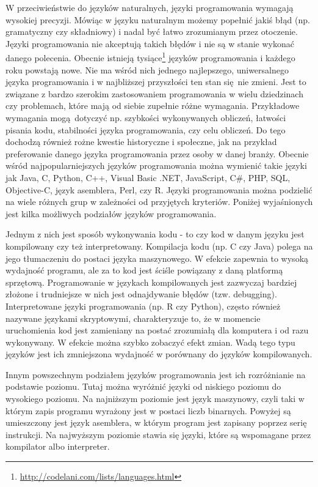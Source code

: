 \documentclass[paper=6in:9in,pagesize=pdftex,headinclude=on,footinclude=on,10pt]{scrbook}
\begin{document}
W przeciwieństwie do języków naturalnych, języki programowania wymagają wysokiej precyzji.
Mówiąc w języku naturalnym możemy popełnić jakiś błąd (np. gramatyczny czy składniowy) i nadal być łatwo zrozumianym przez otoczenie.
Języki programowania nie akceptują takich błędów i nie są w stanie wykonać danego polecenia.
Obecnie istnieją tysiące\footnote{\url{http://codelani.com/lists/languages.html}} języków programowania i każdego roku powstają nowe.
Nie ma wśród nich jednego najlepszego, uniwersalnego języka programowania i w najbliższej przyszłości ten stan się~nie zmieni.
Jest to związane z bardzo szerokim zastosowaniem programowania w wielu dziedzinach czy problemach, które mają od siebie zupełnie różne wymagania.
Przykładowe wymagania mogą~dotyczyć np. szybkości wykonywanych obliczeń, łatwości pisania kodu, stabilności języka programowania, czy celu obliczeń.
Do tego dochodzą również rożne kwestie historyczne i społeczne, jak na przykład preferowanie danego języka programowania przez osoby w danej branży.
Obecnie wśród najpopularniejszych języków programowania można wymienić takie języki jak Java, C, Python, C++, Visual Basic .NET, JavaScript, C\#, PHP, SQL, Objective-C, język asemblera, Perl, czy R.
Języki programowania można podzielić na wiele różnych grup w zależności od przyjętych kryteriów.
Poniżej wyjaśnionych jest kilka możliwych podziałów języków programowania.

Jednym z nich jest sposób wykonywania kodu - to czy kod w danym języku jest kompilowany czy też interpretowany.
Kompilacja kodu (np. C czy Java) polega na jego tłumaczeniu do postaci języka maszynowego.
W efekcie zapewnia to wysoką wydajność programu, ale za to kod jest ściśle powiązany z daną platformą sprzętową.
Programowanie w językach kompilowanych jest zazwyczaj bardziej złożone i trudniejsze w nich jest odnajdywanie błędów (tzw. debugging).
Interpretowane języki programowania (np. R czy Python), często również nazywane językami skryptowymi, charakteryzuje to,
że w momencie uruchomienia kod jest zamieniany na postać zrozumiałą dla komputera i od razu wykonywany.
W efekcie można szybko zobaczyć efekt zmian.
Wadą tego typu języków jest ich zmniejszona wydajność w porównany do języków kompilowanych.

Innym powszechnym podziałem języków programowania jest ich rozróżnianie na podstawie poziomu.
Tutaj można wyróżnić języki od niskiego poziomu do wysokiego poziomu.
Na najniższym poziomie jest język maszynowy, czyli taki w którym zapis programu wyrażony jest w postaci liczb binarnych.
Powyżej są umieszczony jest język asemblera, w którym program jest zapisany poprzez serię instrukcji.
Na najwyższym poziomie stawia się języki, które są wspomagane przez kompilator albo interpreter.
\end{document}
